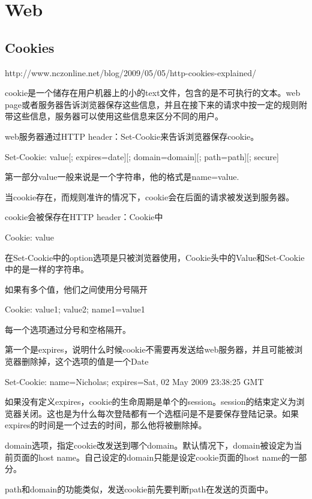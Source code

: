 \chapter{Web}

\section{Cookies}

http://www.nczonline.net/blog/2009/05/05/http-cookies-explained/

cookie是一个储存在用户机器上的小的text文件，包含的是不可执行的文本。web page或者服务器告诉浏览器保存这些信息，并且在接下来的请求中按一定的规则附带这些信息，服务器可以使用这些信息来区分不同的用户。

web服务器通过HTTP header：Set-Cookie来告诉浏览器保存cookie。
\begin{HTML5}
Set-Cookie: value[; expires=date][; domain=domain][; path=path][; secure]
\end{HTML5}

第一部分value一般来说是一个字符串，他的格式是name=value.

当cookie存在，而规则准许的情况下，cookie会在后面的请求被发送到服务器。

cookie会被保存在HTTP header：Cookie中
\begin{HTML5}
Cookie: value
\end{HTML5}
在Set-Cookie中的option选项是只被浏览器使用，Cookie头中的Value和Set-Cookie中的是一样的字符串。

如果有多个值，他们之间使用分号隔开
\begin{HTML5}
Cookie: value1; value2; name1=value1
\end{HTML5}

每一个选项通过分号和空格隔开。

第一个是expires，说明什么时候cookie不需要再发送给web服务器，并且可能被浏览器删除掉，这个选项的值是一个Date
\begin{HTML5}
Set-Cookie: name=Nicholas; expires=Sat, 02 May 2009 23:38:25 GMT
\end{HTML5}
如果没有定义expires，cookie的生命周期是单个的session。session的结束定义为浏览器关闭。这也是为什么每次登陆都有一个选框问是不是要保存登陆记录。如果expires的时间是一个过去的时间，那么他将被删除掉。

domain选项，指定cookie改发送到哪个domain。默认情况下，domain被设定为当前页面的host name。自己设定的domain只能是设定cookie页面的host name的一部分。

path和domain的功能类似，发送cookie前先要判断path在发送的页面中。

